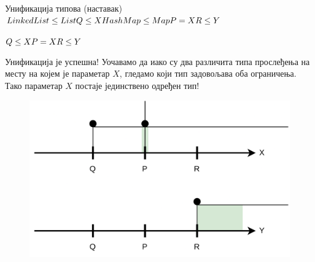 \documentclass[xcolor=table]{beamer}
\begin{document}
\begin{frame}[allowframebreaks]{Унификација типова (наставак)}
        \begin{math}
LinkedList \leq List
\newline
Q \leq X
\newline
HashMap \leq Map
\newline
P = X
\newline
R \leq Y
\newline
        \end{math}
        
        \framebreak
        
        \begin{math}
Q \leq X
\newline
P = X
\newline
R \leq Y
\newline
        \end{math}
        
        Унификација је успешна!
        \newline\newline
        Уочавамо да иако су два различита типа прослеђења на месту на којем је параметар \begin{math}X\end{math}, гледамо који тип задовољава оба ограничења.
        \newline\newline
        Тако параметар \begin{math}X\end{math} постаје јединствено одређен тип!
        
        \framebreak
        
        \begin{figure}
            \centering
            \includegraphics[width=\textwidth,height=0.8\textheight,keepaspectratio]{images/unip2.png}
        \end{figure}
        

\end{frame}
\end{document}

